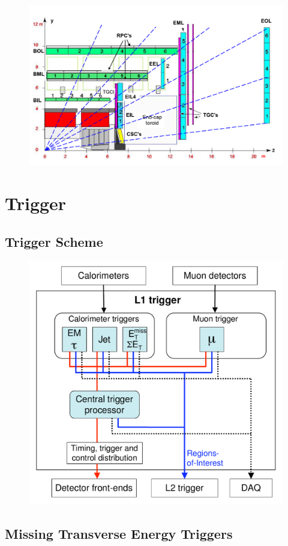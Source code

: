 \begin{figure}[hbtp]
\includegraphics[width=\fullfig]{figures/muon_side_schematic.pdf}
\caption{}
\label{fig:muon_side_schematic}
\end{figure}



\section{Trigger}
\label{sec:trigger}

\subsection{Trigger Scheme}

\begin{figure}[hbtp]
\includegraphics[width=\fullfig]{figures/l1_diagram.pdf}
\caption{}
\label{fig:l1_diagram}
\end{figure}

\subsection{Missing Transverse Energy Triggers}

